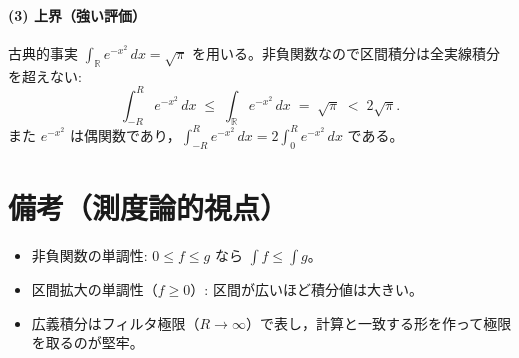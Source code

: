 \documentclass[a4paper,12pt]{article}
\newcommand{\R}{\mathbb{R}}
\begin{document}
\paragraph{(3) 上界（強い評価）} 古典的事実 $\displaystyle \int_{\R} e^{-x^2}\,dx = \sqrt{\pi}$ を用いる。非負関数なので区間積分は全実線積分を超えない:
\[
  \int_{-R}^{R} e^{-x^2}\,dx \;\le\; \int_{\R} e^{-x^2}\,dx \;=\; \sqrt{\pi} \;<\; 2\sqrt{\pi}.
\]
また $e^{-x^2}$ は偶関数であり，$\int_{-R}^{R} e^{-x^2}\,dx = 2\int_0^R e^{-x^2}\,dx$ である。

\section*{備考（測度論的視点）}
\begin{itemize}
  \item 非負関数の単調性: $0\le f\le g$ なら $\int f \le \int g$。
  \item 区間拡大の単調性（$f\ge 0$）: 区間が広いほど積分値は大きい。
  \item 広義積分はフィルタ極限（$R\to\infty$）で表し，計算と一致する形を作って極限を取るのが堅牢。
\end{itemize}
\end{document}
